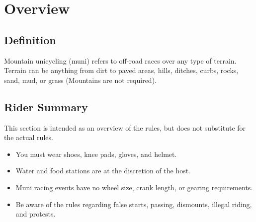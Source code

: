\chapter{Overview \label{chap:muni_racing}}

\section{Definition}

Mountain unicycling (muni) refers to off-road races over any type of terrain.
Terrain can be anything from dirt to paved areas, hills, ditches, curbs, rocks, sand, mud, or grass (Mountains are not required).

\section{Rider Summary}

This section is intended as an overview of the rules, but does not
substitute for the actual rules.
\begin{itemize}
\item You must wear shoes, knee pads, gloves, and helmet.
\item Water and food stations are at the discretion of the host.
\item Muni racing events have no wheel size, crank length, or gearing
requirements.
\item Be aware of the rules regarding false starts, passing, dismounts, illegal riding, and protests.
\end{itemize}

